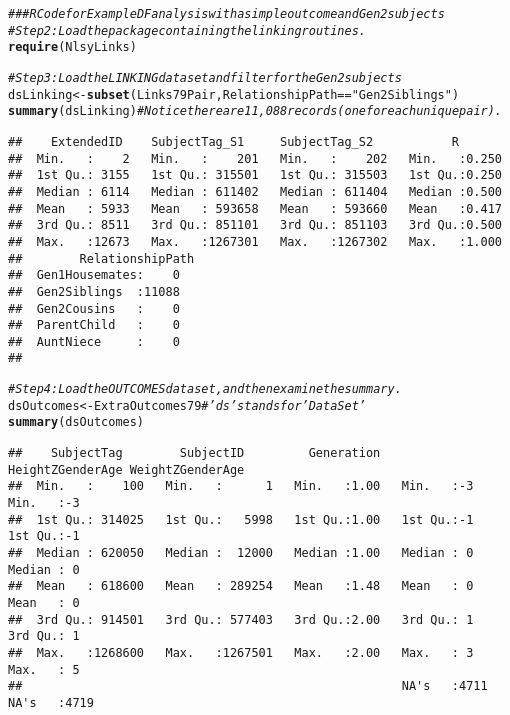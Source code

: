 \documentclass{article}\usepackage[]{graphicx}\usepackage[]{color}
\makeatletter
\newcommand{\hlstr}[1]{\textcolor[rgb]{0.192,0.494,0.8}{#1}}%
\newcommand{\hlcom}[1]{\textcolor[rgb]{0.678,0.584,0.686}{\textit{#1}}}%
\newcommand{\hlopt}[1]{\textcolor[rgb]{0,0,0}{#1}}%
\newcommand{\hlstd}[1]{\textcolor[rgb]{0.345,0.345,0.345}{#1}}%
\newcommand{\hlkwb}[1]{\textcolor[rgb]{0.69,0.353,0.396}{#1}}%
\newcommand{\hlkwd}[1]{\textcolor[rgb]{0.737,0.353,0.396}{\textbf{#1}}}%
\newenvironment{kframe}{%
 \def\at@end@of@kframe{}%
 \ifinner\ifhmode%
  \def\at@end@of@kframe{\end{minipage}}%
  \begin{minipage}{\columnwidth}%
 \fi\fi%
 \def\FrameCommand##1{\hskip\@totalleftmargin \hskip-\fboxsep
 \colorbox{shadecolor}{##1}\hskip-\fboxsep
     \hskip-\linewidth \hskip-\@totalleftmargin \hskip\columnwidth}%
 \MakeFramed {\advance\hsize-\width
   \@totalleftmargin\z@ \linewidth\hsize
   \@setminipage}}%
 {\par\unskip\endMakeFramed%
 \at@end@of@kframe}
\newenvironment{knitrout}{}{} %
\makeatother
\begin{document}
\begin{knitrout}
\color{fgcolor}\begin{kframe}
\begin{alltt}
\hlcom{### R Code for Example DF analysis with a simple outcome and Gen2 subjects}
\hlcom{#Step 2: Load the package containing the linking routines.}
\hlkwd{require}\hlstd{(NlsyLinks)}

\hlcom{#Step 3: Load the LINKING dataset and filter for the Gen2 subjects}
\hlstd{dsLinking} \hlkwb{<-} \hlkwd{subset}\hlstd{(Links79Pair, RelationshipPath}\hlopt{==}\hlstr{"Gen2Siblings"}\hlstd{)}
\hlkwd{summary}\hlstd{(dsLinking)} \hlcom{#Notice there are 11,088 records (one for each unique pair).}
\end{alltt}
\begin{verbatim}
##    ExtendedID    SubjectTag_S1     SubjectTag_S2           R        
##  Min.   :    2   Min.   :    201   Min.   :    202   Min.   :0.250  
##  1st Qu.: 3155   1st Qu.: 315501   1st Qu.: 315503   1st Qu.:0.250  
##  Median : 6114   Median : 611402   Median : 611404   Median :0.500  
##  Mean   : 5933   Mean   : 593658   Mean   : 593660   Mean   :0.417  
##  3rd Qu.: 8511   3rd Qu.: 851101   3rd Qu.: 851103   3rd Qu.:0.500  
##  Max.   :12673   Max.   :1267301   Max.   :1267302   Max.   :1.000  
##        RelationshipPath
##  Gen1Housemates:    0  
##  Gen2Siblings  :11088  
##  Gen2Cousins   :    0  
##  ParentChild   :    0  
##  AuntNiece     :    0  
## 
\end{verbatim}
\begin{alltt}
\hlcom{#Step 4: Load the OUTCOMES dataset, and then examine the summary.}
\hlstd{dsOutcomes} \hlkwb{<-} \hlstd{ExtraOutcomes79} \hlcom{#'ds' stands for 'Data Set'}
\hlkwd{summary}\hlstd{(dsOutcomes)}
\end{alltt}
\begin{verbatim}
##    SubjectTag        SubjectID         Generation   HeightZGenderAge WeightZGenderAge
##  Min.   :    100   Min.   :      1   Min.   :1.00   Min.   :-3       Min.   :-3      
##  1st Qu.: 314025   1st Qu.:   5998   1st Qu.:1.00   1st Qu.:-1       1st Qu.:-1      
##  Median : 620050   Median :  12000   Median :1.00   Median : 0       Median : 0      
##  Mean   : 618600   Mean   : 289254   Mean   :1.48   Mean   : 0       Mean   : 0      
##  3rd Qu.: 914501   3rd Qu.: 577403   3rd Qu.:2.00   3rd Qu.: 1       3rd Qu.: 1      
##  Max.   :1268600   Max.   :1267501   Max.   :2.00   Max.   : 3       Max.   : 5      
##                                                     NA's   :4711     NA's   :4719    

\end{verbatim}
\end{kframe}
\end{knitrout}
\end{document}
